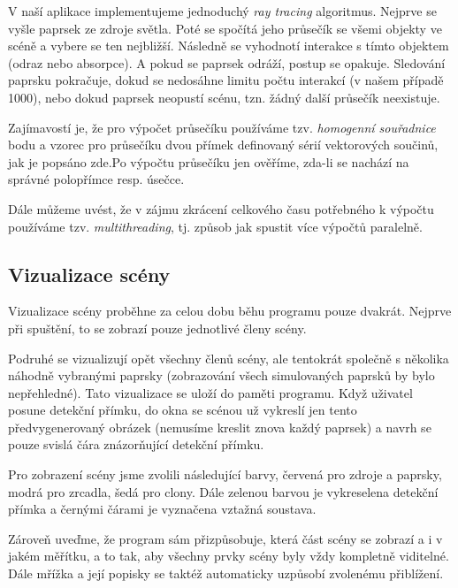 V naší aplikace implementujeme jednoduchý \emph{ray tracing} algoritmus. Nejprve se vyšle paprsek ze zdroje světla. Poté se spočítá jeho průsečík se všemi objekty ve scéně a vybere se ten nejbližší. Následně se vyhodnotí interakce s tímto objektem (odraz nebo absorpce). A pokud se paprsek odráží, postup se opakuje. Sledování paprsku pokračuje, dokud se nedosáhne limitu počtu interakcí (v našem případě 1000), nebo dokud paprsek neopustí scénu, tzn. žádný další průsečík neexistuje.

Zajímavostí je, že pro výpočet průsečíku používáme tzv. \emph{homogenní souřadnice} bodu a vzorec pro průsečíku dvou přímek definovaný sérií vektorových součinů, jak je popsáno zde.\src Po výpočtu průsečíku jen ověříme, zda-li se nachází na správné polopřímce resp. úsečce.

Dále můžeme uvést, že v zájmu zkrácení celkového času potřebného k výpočtu používáme tzv. \emph{multithreading}, tj. způsob jak spustit více výpočtů paralelně.

\subsection{Vizualizace scény}

Vizualizace scény proběhne za celou dobu běhu programu pouze dvakrát. Nejprve při spuštění, to se zobrazí pouze jednotlivé členy scény.


Podruhé se vizualizují opět všechny členů scény, ale tentokrát společně s několika náhodně vybranými paprsky (zobrazování všech simulovaných paprsků by bylo nepřehledné). Tato vizualizace se uloží do paměti programu. Když uživatel posune detekční přímku, do okna se scénou už vykreslí jen tento předvygenerovaný obrázek (nemusíme kreslit znova každý paprsek) a navrh se pouze svislá čára znázorňující detekční přímku.


Pro zobrazení scény jsme zvolili následující barvy, červená pro zdroje a paprsky, modrá pro zrcadla, šedá pro clony. Dále zelenou barvou je vykreselena detekční přímka a černými čárami je vyznačena vztažná soustava.

Zároveň uveďme, že program sám přizpůsobuje, která část scény se zobrazí a i v jakém měřítku, a to tak, aby všechny prvky scény byly vždy kompletně viditelné. Dále mřížka a její popisky se taktéž automaticky uzpůsobí zvolenému přiblížení.

